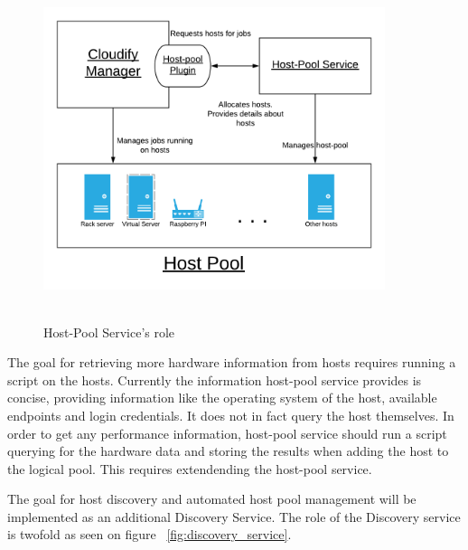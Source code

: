  \begin{figure}[ht!]
\centering
  \includegraphics[width=10cm,height=10cm, keepaspectratio]{Cloudify_roles.png}%
  \caption{Host-Pool Service's role}
  \label{fig:cloudify_roles}
\end{figure}

The goal for retrieving more hardware information from hosts requires running a script on the hosts. Currently the information host-pool service provides is concise, providing information like the operating system of the host, available endpoints and login credentials. It does not in fact query the host themselves. In order to get any performance information, host-pool service should run a script querying for the hardware data and storing the results when adding the host to the logical pool. This requires extendending  the host-pool service.

The goal for host discovery and automated host pool management will be implemented as an additional Discovery Service.
The role of the Discovery service is twofold as seen on figure ~\ref{fig:discovery_service}.


